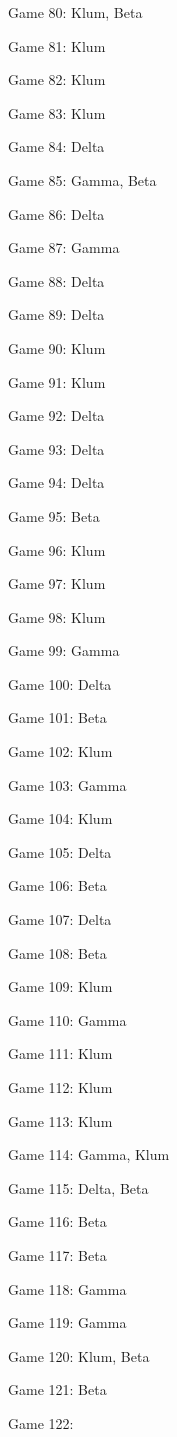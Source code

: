 \documentclass{article}
\begin{document}
\begin{multicols}{3}
\begin{compactitem}
\item Game 80:
Klum, Beta
\item Game 81:
Klum
\item Game 82:
Klum
\item Game 83:
Klum
\item Game 84:
Delta
\item Game 85:
Gamma, Beta
\item Game 86:
Delta
\item Game 87:
Gamma
\item Game 88:
Delta
\item Game 89:
Delta
\item Game 90:
Klum
\item Game 91:
Klum
\item Game 92:
Delta
\item Game 93:
Delta
\item Game 94:
Delta
\item Game 95:
Beta
\item Game 96:
Klum
\item Game 97:
Klum
\item Game 98:
Klum
\item Game 99:
Gamma
\item Game 100:
Delta
\item Game 101:
Beta
\item Game 102:
Klum
\item Game 103:
Gamma
\item Game 104:
Klum
\item Game 105:
Delta
\item Game 106:
Beta
\item Game 107:
Delta
\item Game 108:
Beta
\item Game 109:
Klum
\item Game 110:
Gamma
\item Game 111:
Klum
\item Game 112:
Klum
\item Game 113:
Klum
\item Game 114:
Gamma, Klum
\item Game 115:
Delta, Beta
\item Game 116:
Beta
\item Game 117:
Beta
\item Game 118:
Gamma
\item Game 119:
Gamma
\item Game 120:
Klum, Beta
\item Game 121:
Beta
\item Game 122:

\end{compactitem}
\end{multicols}
\end{document}
